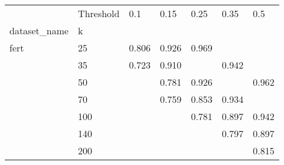 \begin{tabular}{lllllll}
\toprule
     & Threshold &    0.1 &   0.15 &   0.25 &   0.35 &    0.5 \\
dataset_name & k &        &        &        &        &        \\
\midrule
fert & 25  &  0.806 &  0.926 &  0.969 &        &        \\
     & 35  &  0.723 &  0.910 &        &  0.942 &        \\
     & 50  &        &  0.781 &  0.926 &        &  0.962 \\
     & 70  &        &  0.759 &  0.853 &  0.934 &        \\
     & 100 &        &        &  0.781 &  0.897 &  0.942 \\
     & 140 &        &        &        &  0.797 &  0.897 \\
     & 200 &        &        &        &        &  0.815 \\
\bottomrule
\end{tabular}
